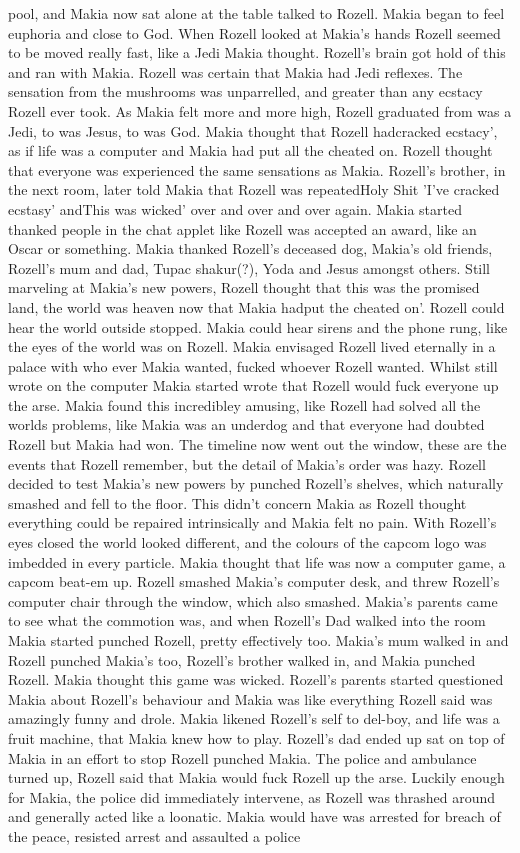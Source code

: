 \documentclass[12pt]{book}
\begin{document}
pool, and Makia now sat alone at the table talked to Rozell. Makia began to feel euphoria and close to God. When Rozell looked at Makia's hands Rozell seemed to be moved really fast, like a Jedi Makia thought. Rozell's brain got hold of this and ran with Makia. Rozell was certain that Makia had Jedi reflexes. The sensation from the mushrooms was unparrelled, and greater than any ecstacy Rozell ever took. As Makia felt more and more high, Rozell graduated from was a Jedi, to was Jesus, to was God. Makia thought that Rozell hadcracked ecstacy', as if life was a computer and Makia had put all the cheated on. Rozell thought that everyone was experienced the same sensations as Makia. Rozell's brother, in the next room, later told Makia that Rozell was repeatedHoly Shit 'I've cracked ecstasy' andThis was wicked' over and over and over again. Makia started thanked people in the chat applet like Rozell was accepted an award, like an Oscar or something. Makia thanked Rozell's deceased dog, Makia's old friends, Rozell's mum and dad, Tupac shakur(?), Yoda and Jesus amongst others. Still marveling at Makia's new powers, Rozell thought that this was the promised land, the world was heaven now that Makia hadput the cheated on'. Rozell could hear the world outside stopped. Makia could hear sirens and the phone rung, like the eyes of the world was on Rozell. Makia envisaged Rozell lived eternally in a palace with who ever Makia wanted, fucked whoever Rozell wanted. Whilst still wrote on the computer Makia started wrote that Rozell would fuck everyone up the arse. Makia found this incredibley amusing, like Rozell had solved all the worlds problems, like Makia was an underdog and that everyone had doubted Rozell but Makia had won. The timeline now went out the window, these are the events that Rozell remember, but the detail of Makia's order was hazy. Rozell decided to test Makia's new powers by punched Rozell's shelves, which naturally smashed and fell to the floor. This didn't concern Makia as Rozell thought everything could be repaired intrinsically and Makia felt no pain. With Rozell's eyes closed the world looked different, and the colours of the capcom logo was imbedded in every particle. Makia thought that life was now a computer game, a capcom beat-em up. Rozell smashed Makia's computer desk, and threw Rozell's computer chair through the window, which also smashed. Makia's parents came to see what the commotion was, and when Rozell's Dad walked into the room Makia started punched Rozell, pretty effectively too. Makia's mum walked in and Rozell punched Makia's too, Rozell's brother walked in, and Makia punched Rozell. Makia thought this game was wicked. Rozell's parents started questioned Makia about Rozell's behaviour and Makia was like everything Rozell said was amazingly funny and drole. Makia likened Rozell's self to del-boy, and life was a fruit machine, that Makia knew how to play. Rozell's dad ended up sat on top of Makia in an effort to stop Rozell punched Makia. The police and ambulance turned up, Rozell said that Makia would fuck Rozell up the arse. Luckily enough for Makia, the police did immediately intervene, as Rozell was thrashed around and generally acted like a loonatic. Makia would have was arrested for breach of the peace, resisted arrest and assaulted a police 
\end{document}
